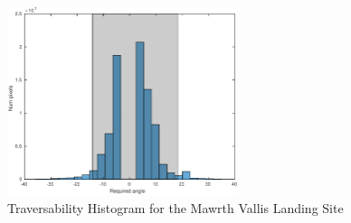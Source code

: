 \documentclass[12pt]{article}
\begin{document}
\begin{figure}[h!]
  \centering
  \includegraphics[width=0.6\textwidth]{figures/maps/ESP_023957_1755/DTEEC_023957_1755_024023_1755_U01-hist.pdf}
  \caption{Traversability Histogram for the Mawrth Vallis Landing Site}
  \label{fig:gale_hist}
\end{figure}
\end{document}

